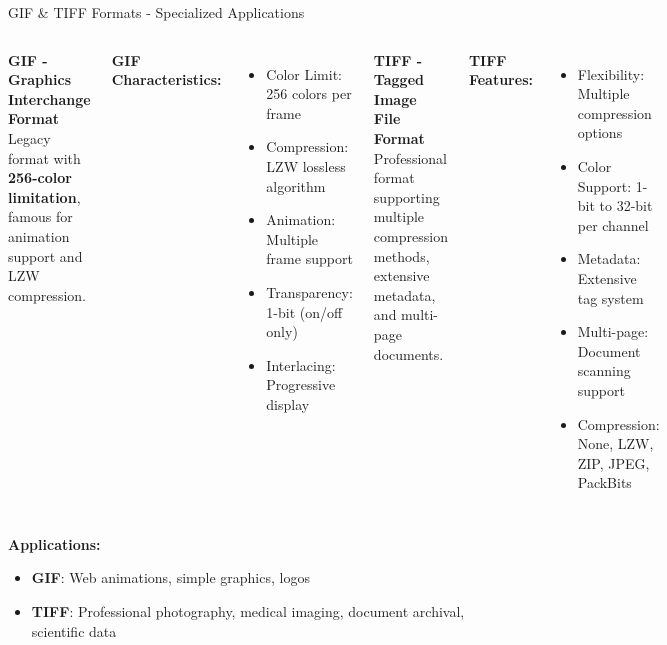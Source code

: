 \documentclass[aspectratio=1610,8pt]{beamer}
\newcommand{\highlight}[1]{\textcolor{navyblue}{\textbf{#1}}}
\begin{document}
\begin{frame}{GIF \& TIFF Formats - Specialized Applications}
\begin{columns}[T]
\begin{alertblock}{\highlight{GIF - Graphics Interchange Format}}
Legacy format with \textbf{256-color limitation}, famous for animation support and LZW compression.
\end{alertblock}

\textbf{GIF Characteristics:}
\begin{itemize}
    \item Color Limit: 256 colors per frame
    \item Compression: LZW lossless algorithm
    \item Animation: Multiple frame support
    \item Transparency: 1-bit (on/off only)
    \item Interlacing: Progressive display
\end{itemize}

\begin{alertblock}{\highlight{TIFF - Tagged Image File Format}}
Professional format supporting multiple compression methods, extensive metadata, and multi-page documents.
\end{alertblock}

\textbf{TIFF Features:}
\begin{itemize}
    \item Flexibility: Multiple compression options
    \item Color Support: 1-bit to 32-bit per channel
    \item Metadata: Extensive tag system
    \item Multi-page: Document scanning support
    \item Compression: None, LZW, ZIP, JPEG, PackBits
\end{itemize}

\end{columns}

\vspace{0.5cm}
\textbf{Applications:}
\begin{itemize}
    \item \textbf{GIF}: Web animations, simple graphics, logos
    \item \textbf{TIFF}: Professional photography, medical imaging, document archival, scientific data
\end{itemize}

\end{frame}
\end{document}
